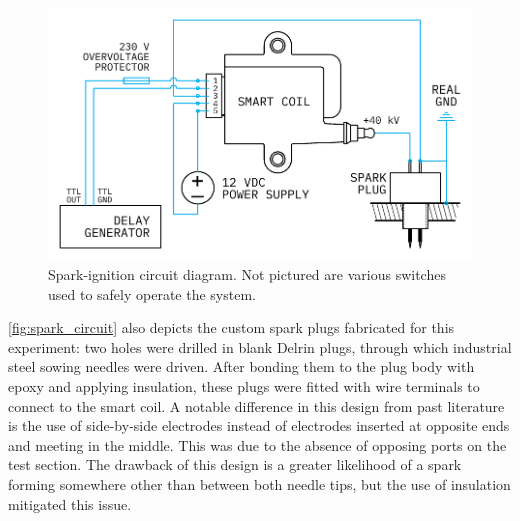             \begin{figure}[h]
                \centering
                \includegraphics[]{assets/3 design/sparkIgniter}
                \caption[Spark-ignition circuit diagram]{Spark-ignition circuit diagram. Not pictured are various switches used to safely operate the system.}
                \label{fig:spark_circuit}
            \end{figure}

            \autoref{fig:spark_circuit} also depicts the custom spark plugs fabricated for this experiment: two holes were drilled in blank Delrin plugs, through which industrial steel sowing needles were driven. After bonding them to the plug body with epoxy and applying insulation, these plugs were fitted with wire terminals to connect to the smart coil. A notable difference in this design from past literature is the use of side-by-side electrodes instead of electrodes inserted at opposite ends and meeting in the middle. This was due to the absence of opposing ports on the test section. The drawback of this design is a greater likelihood of a spark forming somewhere other than between both needle tips, but the use of insulation mitigated this issue.

